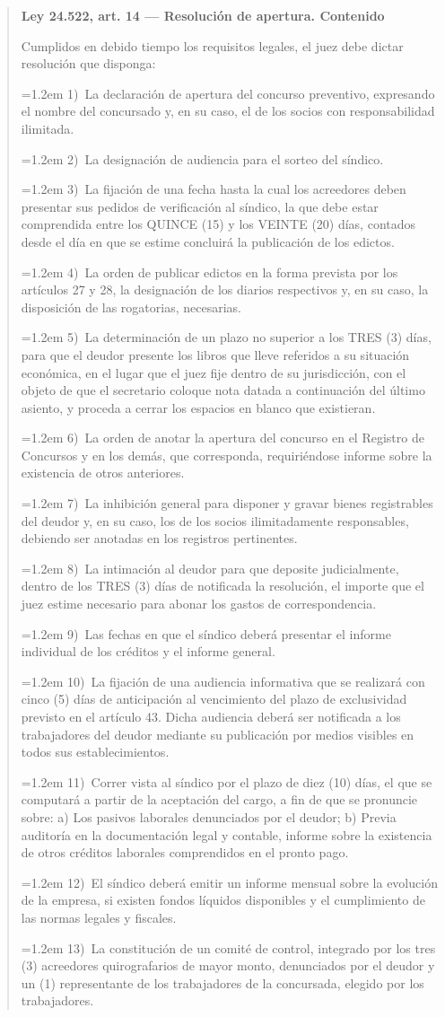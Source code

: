 \documentclass[12pt,oneside]{book}
\newenvironment{articulo}[1]
  {\begin{quote}\small\textbf{#1}\par\smallskip}
  {\end{quote}}
\newcommand{\inciso}[2]{\par\noindent\hangindent=1.2em\hangafter=1 #1)~#2}
\begin{document}
\begin{articulo}{Ley 24.522, art. 14 --- Resolución de apertura. Contenido}
Cumplidos en debido tiempo los requisitos legales, el juez debe dictar resolución que disponga:
\inciso{1}{La declaración de apertura del concurso preventivo, expresando el nombre del concursado y, en su caso, el de los socios con responsabilidad ilimitada.}
\inciso{2}{La designación de audiencia para el sorteo del síndico.}
\inciso{3}{La fijación de una fecha hasta la cual los acreedores deben presentar sus pedidos de verificación al síndico, la que debe estar comprendida entre los QUINCE (15) y los VEINTE (20) días, contados desde el día en que se estime concluirá la publicación de los edictos.}
\inciso{4}{La orden de publicar edictos en la forma prevista por los artículos 27 y 28, la designación de los diarios respectivos y, en su caso, la disposición de las rogatorias, necesarias.}
\inciso{5}{La determinación de un plazo no superior a los TRES (3) días, para que el deudor presente los libros que lleve referidos a su situación económica, en el lugar que el juez fije dentro de su jurisdicción, con el objeto de que el secretario coloque nota datada a continuación del último asiento, y proceda a cerrar los espacios en blanco que existieran.}
\inciso{6}{La orden de anotar la apertura del concurso en el Registro de Concursos y en los demás, que corresponda, requiriéndose informe sobre la existencia de otros anteriores.}
\inciso{7}{La inhibición general para disponer y gravar bienes registrables del deudor y, en su caso, los de los socios ilimitadamente responsables, debiendo ser anotadas en los registros pertinentes.}
\inciso{8}{La intimación al deudor para que deposite judicialmente, dentro de los TRES (3) días de notificada la resolución, el importe que el juez estime necesario para abonar los gastos de correspondencia.}
\inciso{9}{Las fechas en que el síndico deberá presentar el informe individual de los créditos y el informe general.}
\inciso{10}{La fijación de una audiencia informativa que se realizará con cinco (5) días de anticipación al vencimiento del plazo de exclusividad previsto en el artículo 43. Dicha audiencia deberá ser notificada a los trabajadores del deudor mediante su publicación por medios visibles en todos sus establecimientos.}
\inciso{11}{Correr vista al síndico por el plazo de diez (10) días, el que se computará a partir de la aceptación del cargo, a fin de que se pronuncie sobre: a) Los pasivos laborales denunciados por el deudor; b) Previa auditoría en la documentación legal y contable, informe sobre la existencia de otros créditos laborales comprendidos en el pronto pago.}
\inciso{12}{El síndico deberá emitir un informe mensual sobre la evolución de la empresa, si existen fondos líquidos disponibles y el cumplimiento de las normas legales y fiscales.}
\inciso{13}{La constitución de un comité de control, integrado por los tres (3) acreedores quirografarios de mayor monto, denunciados por el deudor y un (1) representante de los trabajadores de la concursada, elegido por los trabajadores.}
\end{articulo}
\end{document}
